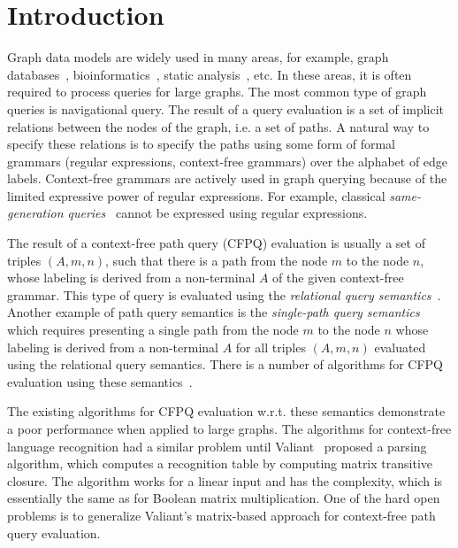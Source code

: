 \section*{Introduction}

Graph data models are widely used in many areas, for example, graph databases~\cite{graphDB}, bioinformatics~\cite{Bio}, static analysis~\cite{zhang2013fast, kodumal2004set}, etc. In these areas, it is often required to process queries for large graphs. The most common type of graph queries is navigational query. The result of a query evaluation is a set of implicit relations between the nodes of the graph, i.e. a set of paths. A natural way to specify these relations is to specify the paths using some form of formal grammars (regular expressions, context-free grammars) over the alphabet of edge labels. Context-free grammars are actively used in graph querying because of the limited expressive power of regular expressions. For example, classical \emph{same-generation queries}~\cite{FndDB} cannot be expressed using regular expressions.

The result of a context-free path query (CFPQ) evaluation is usually a set of triples \mbox{$(A, m, n)$}, such that there is a path from the node $m$ to the node $n$, whose labeling is derived from a non-terminal $A$ of the given context-free grammar. This type of query is evaluated using the \emph{relational query semantics}~\cite{hellingsRelational}. Another example of path query semantics is the \textit{single-path query semantics}~\cite{hellingsPathQuerying} which requires presenting a single path from the node $m$ to the node $n$ whose labeling is derived from a non-terminal $A$ for all triples $(A, m, n)$ evaluated using the relational query semantics. There is a number of algorithms for CFPQ evaluation using these semantics~\cite{RDF, GLL, hellingsRelational, hellingsPathQuerying, GraphQueryWithEarley}.

The existing algorithms for CFPQ evaluation w.r.t. these semantics demonstrate a poor performance when applied to large graphs. The algorithms for context-free language recognition had a similar problem until Valiant~\cite{valiant} proposed a parsing algorithm, which computes a recognition table by computing matrix transitive closure. The algorithm works for a linear input and has the complexity, which is essentially the same as for Boolean matrix multiplication. One of the hard open problems is to generalize Valiant's matrix-based approach for context-free path query evaluation.

